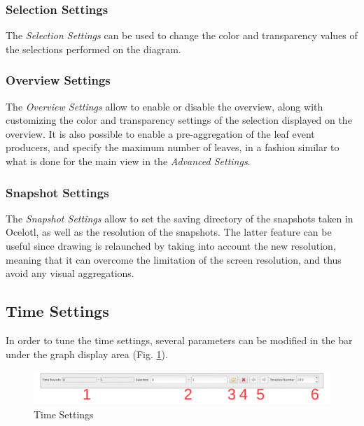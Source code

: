 \documentclass[twoside]{article}
\begin{document}
\begin{sloppypar}
\subsubsection{Selection Settings}
The \textit{Selection Settings} can be used to change the color and transparency values of the selections performed on the diagram.

\subsubsection{Overview Settings}
The \textit{Overview Settings} allow to enable or disable the overview, along with customizing the color and transparency settings of the selection displayed on the overview. It is also possible to enable a pre-aggregation of the leaf event producers, and specify the maximum number of leaves, in a fashion similar to what is done for the main view in the \textit{Advanced Settings}.

\subsubsection{Snapshot Settings}
The \textit{Snapshot Settings} allow to set the saving directory of the snapshots taken in Ocelotl, as well as the resolution of the snapshots. The latter feature can be useful since drawing is relaunched by taking into account the new resolution, meaning that it can overcome the limitation of the screen resolution, and thus avoid any visual aggregations.

\subsection{Time Settings}
In order to tune the time settings, several parameters can be modified in the bar under the graph display area (Fig. \ref{timeSettings}).
 
\begin{figure}[h!]
	\centering
	\includegraphics[width=1.0\textwidth]{images/ocelotl_bottom_time.pdf}
	\caption{Time Settings}
	\label{timeSettings}
\end{figure}


\end{sloppypar}
\end{document}
